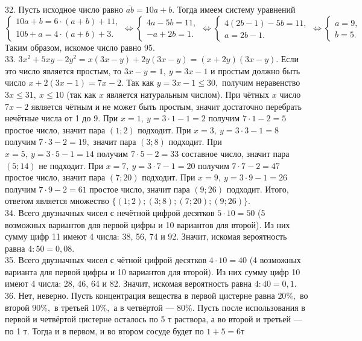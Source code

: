 \documentclass[12pt]{article}
\begin{document}
32. Пусть исходное число равно $\overline{ab}=10a+b.$ Тогда имеем систему уравнений \\$\begin{cases} 10a+b=6\cdot(a+b)+11,\\ 10b+a=4\cdot(a+b)+3.\end{cases}\Leftrightarrow \begin{cases} 4a-5b=11,\\ -a+2b=1.\end{cases}\Leftrightarrow \begin{cases} 4(2b-1)-5b=11,\\ a=2b-1.\end{cases}
\Leftrightarrow \begin{cases} a=9,\\ b=5.\end{cases}$ Таким образом, искомое число равно 95.\\
33. $3x^2+5xy-2y^2=x(3x-y)+2y(3x-y)=(x+2y)(3x-y).$ Если это число является простым, то $3x-y=1,\ y=3x-1$ и простым должно быть число $x+2(3x-1)=7x-2.$ Так как $y=3x-1\leqslant30,$ получим неравенство $3x\leqslant31,\ x\leqslant 10$ (так как $x$ является натуральным числом). При чётных $x$ число $7x-2$ является чётным и не может быть простым, значит достаточно перебрать нечётные числа от 1 до 9. При $x=1,\ y=3\cdot1-1=2$ получим $7\cdot1-2=5$ простое число, значит пара $(1;2)$ подходит. При $x=3,\ y=3\cdot3-1=8$ получим $7\cdot3-2=19,$ значит пара $(3;8)$ подходит. При $x=5,\ y=3\cdot5-1=14$ получим $7\cdot5-2=33$ составное число, значит пара $(5;14)$ не подходит. При $x=7,\ y=3\cdot7-1=20$ получим $7\cdot7-2=47$ простое число, значит пара $(7;20)$ подходит. При $x=9,\ y=3\cdot9-1=26$ получим $7\cdot9-2=61$ простое число, значит пара $(9;26)$ подходит. Итого, ответом является множество $\{(1;2); (3;8); (7;20); (9;26)\}.$\\
34. Всего двузначных чисел с нечётной цифрой десятков $5\cdot10=50$ (5 возможных вариантов для первой цифры и 10 вариантов для второй). Из них сумму цифр 11 имеют
4 числа: 38, 56, 74 и 92. Значит, искомая вероятность равна $4:50=0,08.$\\
35. Всего двузначных чисел с чётной цифрой десятков $4\cdot10=40$ (4 возможных варианта для первой цифры и 10 вариантов для второй). Из них сумму цифр 10 имеют
4 числа: 28, 46, 64 и 82. Значит, искомая вероятность равна $4:40=0,1.$\\
36. Нет, неверно. Пусть концентрация вещества в первой цистерне равна $20\%,$ во второй $90\%,$ в третьей $10\%,$ а в четвёртой --- $80\%.$ Пусть после использования в первой и четвёртой цистерне осталось по 5 т раствора, а во второй и третьей --- по 1 т. Тогда и в первом, и во втором сосуде будет по $1+5=6$т
\end{document}

